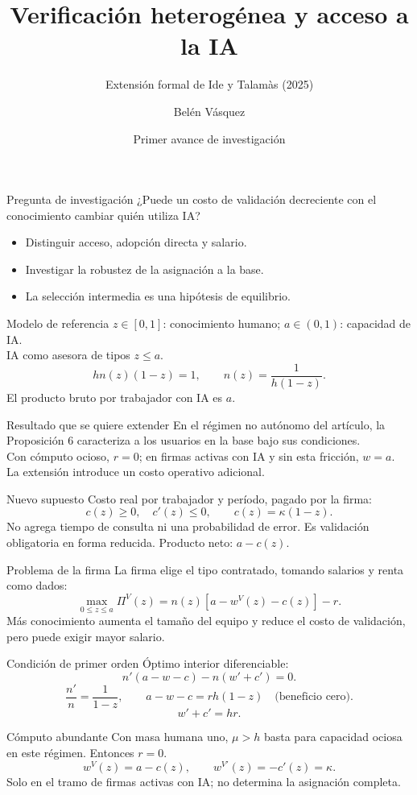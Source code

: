 \documentclass[aspectratio=169,11pt]{beamer}
\title{Verificación heterogénea y acceso a la IA}
\subtitle{Extensión formal de Ide y Talamàs (2025)}
\author{Belén Vásquez}
\date{Primer avance de investigación}
\begin{document}
\begin{frame}\titlepage\end{frame}
\begin{frame}{Pregunta de investigación}
¿Puede un costo de validación decreciente con el conocimiento cambiar quién utiliza IA?\begin{itemize}\item Distinguir acceso, adopción directa y salario.\item Investigar la robustez de la asignación a la base.\item La selección intermedia es una hipótesis de equilibrio.\end{itemize}
\end{frame}
\begin{frame}{Modelo de referencia}
$z\in[0,1]$: conocimiento humano; $a\in(0,1)$: capacidad de IA.\\ IA como asesora de tipos $z\leq a$.\[hn(z)(1-z)=1,\qquad n(z)=\frac1{h(1-z)}.\] El producto bruto por trabajador con IA es $a$.
\end{frame}
\begin{frame}{Resultado que se quiere extender}
En el régimen no autónomo del artículo, la Proposición 6 caracteriza a los usuarios en la base bajo sus condiciones.\\ Con cómputo ocioso, $r=0$; en firmas activas con IA y sin esta fricción, $w=a$.\\ La extensión introduce un costo operativo adicional.
\end{frame}
\begin{frame}{Nuevo supuesto}
Costo real por trabajador y período, pagado por la firma:\[c(z)\geq0,\quad c'(z)\leq0,\qquad c(z)=\kappa(1-z).\] No agrega tiempo de consulta ni una probabilidad de error. Es validación obligatoria en forma reducida. Producto neto: $a-c(z)$.
\end{frame}
\begin{frame}{Problema de la firma}
La firma elige el tipo contratado, tomando salarios y renta como dados:\[\max_{0\leq z\leq a}\Pi^V(z)=n(z)[a-w^V(z)-c(z)]-r.\] Más conocimiento aumenta el tamaño del equipo y reduce el costo de validación, pero puede exigir mayor salario.
\end{frame}
\begin{frame}{Condición de primer orden}
Óptimo interior diferenciable:\[n'(a-w-c)-n(w'+c')=0.\]\[\frac{n'}{n}=\frac1{1-z},\qquad a-w-c=rh(1-z)\quad\text{(beneficio cero)}.\]\[\boxed{w'+c'=hr}.\]
\end{frame}
\begin{frame}{Cómputo abundante}
Con masa humana uno, $\mu>h$ basta para capacidad ociosa en este régimen. Entonces $r=0$.\[w^V(z)=a-c(z),\qquad w^{V\prime}(z)=-c'(z)=\kappa.\] Solo en el tramo de firmas activas con IA; no determina la asignación completa.
\end{frame}
\end{document}
